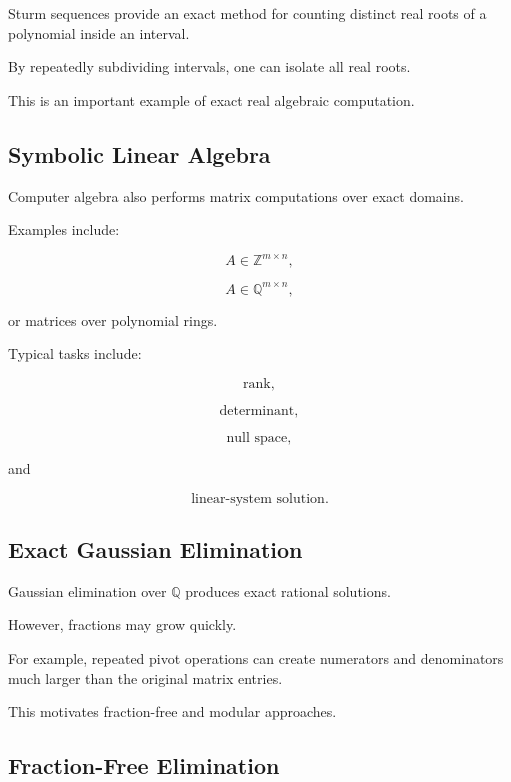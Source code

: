 Sturm sequences provide an exact method for counting distinct real roots
of a polynomial inside an interval.

By repeatedly subdividing intervals, one can isolate all real roots.

This is an important example of exact real algebraic computation.

\subsection{Symbolic Linear Algebra}
\label{subsec:computer-algebra-symbolic-linear-algebra}

Computer algebra also performs matrix computations over exact domains.

Examples include:

\[
\boxed{
A\in\mathbb{Z}^{m\times n},
}
\]

\[
\boxed{
A\in\mathbb{Q}^{m\times n},
}
\]

or matrices over polynomial rings.

Typical tasks include:

\[
\boxed{
\text{rank},
}
\]

\[
\boxed{
\text{determinant},
}
\]

\[
\boxed{
\text{null space},
}
\]

and

\[
\boxed{
\text{linear-system solution}.
}
\]

\subsection{Exact Gaussian Elimination}
\label{subsec:exact-gaussian-elimination}

Gaussian elimination over \(\mathbb{Q}\) produces exact rational
solutions.

However, fractions may grow quickly.

For example, repeated pivot operations can create numerators and
denominators much larger than the original matrix entries.

This motivates fraction-free and modular approaches.

\subsection{Fraction-Free Elimination}
\label{subsec:fraction-free-elimination}

